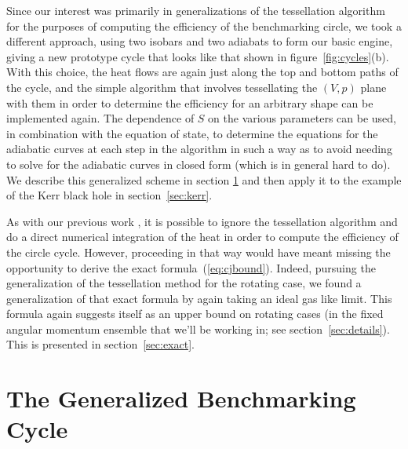 \documentclass[letterpaper,11pt]{article}
\begin{document}
Since our interest was primarily in generalizations of the tessellation algorithm  for the purposes of computing the efficiency of the benchmarking circle, we took a different approach, using two isobars and two adiabats to form our basic engine, giving a new prototype cycle that looks like that shown in figure~\ref{fig:cycles}(b). With this choice,  the heat flows are again just along the top and bottom paths of the cycle, and the simple algorithm that involves tessellating the $(V,p)$ plane with them in order to determine the efficiency for an arbitrary shape can be implemented again. The dependence of $S$ on the various parameters can be used, in combination with the equation of state, to determine the equations for the adiabatic curves at each step in the algorithm in such a way as to avoid needing to solve for the adiabatic curves in closed form (which is in general hard to do). We describe this generalized scheme in section \ref{sec:benchmarkgeneral} and then apply it to the example of the Kerr black hole in section~\ref{sec:kerr}. 
  
  As with our previous work \cite{Chakraborty:2016ssb}, it is possible to ignore the tessellation algorithm and do a direct numerical integration of the heat in order to compute the efficiency of the circle cycle. However, proceeding in that way would have meant missing the opportunity to derive the exact formula~(\ref{eq:cjbound}). Indeed, pursuing the generalization of the tessellation method for the rotating case, we found a generalization of that exact formula  by again taking an ideal gas like limit. This formula again suggests itself as an upper bound on  rotating  cases (in the fixed angular momentum ensemble that we'll be working in; see section~\ref{sec:details}). This is presented in section~\ref{sec:exact}.
 


\section{The Generalized Benchmarking Cycle}
\label{sec:benchmarkgeneral}
\end{document}
